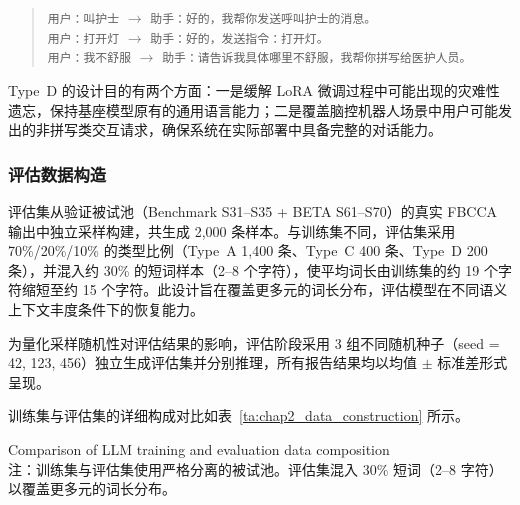 \begin{quote}
\small
\texttt{用户：叫护士} $\rightarrow$ \texttt{助手：好的，我帮你发送呼叫护士的消息。} \\
\texttt{用户：打开灯} $\rightarrow$ \texttt{助手：好的，发送指令：打开灯。} \\
\texttt{用户：我不舒服} $\rightarrow$ \texttt{助手：请告诉我具体哪里不舒服，我帮你拼写给医护人员。}
\end{quote}

Type~D 的设计目的有两个方面：一是缓解 LoRA 微调过程中可能出现的灾难性遗忘，保持基座模型原有的通用语言能力；二是覆盖脑控机器人场景中用户可能发出的非拼写类交互请求，确保系统在实际部署中具备完整的对话能力。

\subsubsection{评估数据构造}

评估集从验证被试池（Benchmark S31--S35 + BETA S61--S70）的真实 FBCCA 输出中独立采样构建，共生成 2,000 条样本。与训练集不同，评估集采用 70\%/20\%/10\% 的类型比例（Type~A 1,400 条、Type~C 400 条、Type~D 200 条），并混入约 30\% 的短词样本（2--8 个字符），使平均词长由训练集的约 19 个字符缩短至约 15 个字符。此设计旨在覆盖更多元的词长分布，评估模型在不同语义上下文丰度条件下的恢复能力。

为量化采样随机性对评估结果的影响，评估阶段采用 3 组不同随机种子（seed = 42, 123, 456）独立生成评估集并分别推理，所有报告结果均以均值 $\pm$ 标准差形式呈现。

训练集与评估集的详细构成对比如表~\ref{ta:chap2_data_construction} 所示。

\begin{table}[htbp]
        {Comparison of LLM training and evaluation data composition}
\label{ta:chap2_data_construction}
\renewcommand{\arraystretch}{1.8}
\centering
{}
\\[0.35em]
{\small 注：训练集与评估集使用严格分离的被试池。评估集混入 30\% 短词（2--8 字符）以覆盖更多元的词长分布。}
\end{table}


